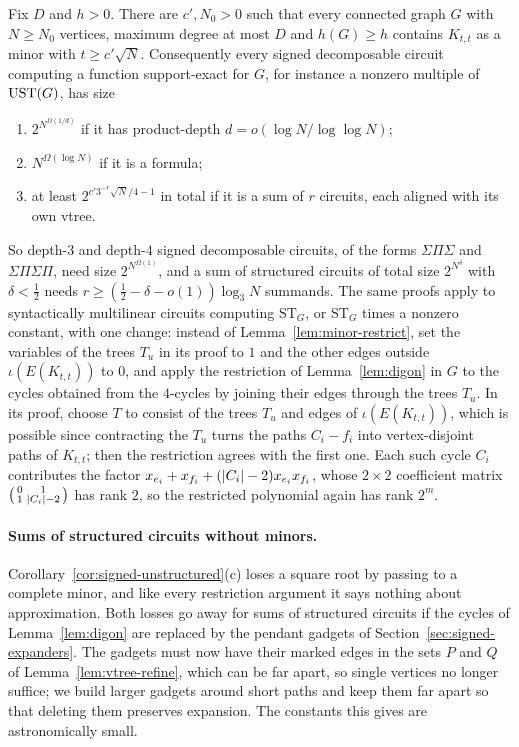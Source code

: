 \begin{corollary}\label{cor:signed-unstructured}
Fix $D$ and $h>0$. There are $c',N_0>0$ such that every connected graph $G$ with $N\ge N_0$ vertices, maximum degree at most $D$ and $h(G)\ge h$ contains $K_{t,t}$ as a minor with $t\ge c'\sqrt N$. Consequently every signed decomposable circuit computing a function support-exact for $G$, for instance a nonzero multiple of $\mathrm{UST}(G)$, has size
\begin{enumerate}[label=(\alph*)]
\item $2^{N^{\Omega(1/d)}}$ if it has product-depth $d=o(\log N/\log\log N)$;
\item $N^{\Omega(\log N)}$ if it is a formula;
\item at least $2^{c'3^{-r}\sqrt N/4-1}$ in total if it is a sum of $r$ circuits, each aligned with its own vtree.
\end{enumerate}
\end{corollary}

So depth-$3$ and depth-$4$ signed decomposable circuits, of the forms $\Sigma\Pi\Sigma$ and $\Sigma\Pi\Sigma\Pi$, need size $2^{N^{\Omega(1)}}$, and a sum of structured circuits of total size $2^{N^\delta}$ with $\delta<\frac12$ needs $r\ge(\frac12-\delta-o(1))\log_3N$ summands. The same proofs apply to syntactically multilinear circuits computing $\mathrm{ST}_G$, or $\mathrm{ST}_G$ times a nonzero constant, with one change: instead of Lemma~\ref{lem:minor-restrict}, set the variables of the trees $T_u$ in its proof to $1$ and the other edges outside $\iota(E(K_{t,t}))$ to $0$, and apply the restriction of Lemma~\ref{lem:digon} in $G$ to the cycles obtained from the $4$-cycles by joining their edges through the trees $T_u$. In its proof, choose $T$ to consist of the trees $T_u$ and edges of $\iota(E(K_{t,t}))$, which is possible since contracting the $T_u$ turns the paths $C_i-f_i$ into vertex-disjoint paths of $K_{t,t}$; then the restriction agrees with the first one. Each such cycle $C_i$ contributes the factor $x_{e_i}+x_{f_i}+(\lvert C_i\rvert-2)x_{e_i}x_{f_i}$, whose $2\times2$ coefficient matrix $\left(\begin{smallmatrix}0&1\\1&\lvert C_i\rvert-2\end{smallmatrix}\right)$ has rank $2$, so the restricted polynomial again has rank $2^m$.

\paragraph{Sums of structured circuits without minors.} Corollary~\ref{cor:signed-unstructured}(c) loses a square root by passing to a complete minor, and like every restriction argument it says nothing about approximation. Both losses go away for sums of structured circuits if the cycles of Lemma~\ref{lem:digon} are replaced by the pendant gadgets of Section~\ref{sec:signed-expanders}. The gadgets must now have their marked edges in the sets $P$ and $Q$ of Lemma~\ref{lem:vtree-refine}, which can be far apart, so single vertices no longer suffice; we build larger gadgets around short paths and keep them far apart so that deleting them preserves expansion. The constants this gives are astronomically small.

